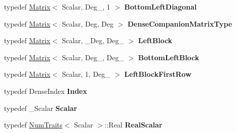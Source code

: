 \begin{DoxyCompactItemize}
typedef \hyperlink{group___core___module_class_eigen_1_1_matrix}{Matrix}$<$ Scalar, Deg\+\_, 1 $>$ {\bfseries Bottom\+Left\+Diagonal}
\item 
\mbox{\label{class_eigen_1_1internal_1_1companion_adcabc9870db81cf1e0db6d645d260c81}} 
typedef \hyperlink{group___core___module_class_eigen_1_1_matrix}{Matrix}$<$ Scalar, Deg, Deg $>$ {\bfseries Dense\+Companion\+Matrix\+Type}
\item 
\mbox{\label{class_eigen_1_1internal_1_1companion_a8a2e8d224bcac4436dd7eb5c04b817d5}} 
typedef \hyperlink{group___core___module_class_eigen_1_1_matrix}{Matrix}$<$ Scalar, \+\_\+\+Deg, Deg\+\_ $>$ {\bfseries Left\+Block}
\item 
\mbox{\label{class_eigen_1_1internal_1_1companion_ae5f271a028b6c68e794ac2f407185672}} 
typedef \hyperlink{group___core___module_class_eigen_1_1_matrix}{Matrix}$<$ Scalar, Deg\+\_, Deg\+\_ $>$ {\bfseries Bottom\+Left\+Block}
\item 
\mbox{\label{class_eigen_1_1internal_1_1companion_afd51b7245870ba33037049bcd2773410}} 
typedef \hyperlink{group___core___module_class_eigen_1_1_matrix}{Matrix}$<$ Scalar, 1, Deg\+\_ $>$ {\bfseries Left\+Block\+First\+Row}
\item 
\mbox{\label{class_eigen_1_1internal_1_1companion_a39a8698e815c86ce2222ac44e5d4bab8}} 
typedef Dense\+Index {\bfseries Index}
\item 
\mbox{\label{class_eigen_1_1internal_1_1companion_a061d1e325a0417ef9cb926133d833e39}} 
typedef \+\_\+\+Scalar {\bfseries Scalar}
\item 
\mbox{\label{class_eigen_1_1internal_1_1companion_a1c462f30c15c1a6233192a2c348139d6}} 
typedef \hyperlink{group___core___module_struct_eigen_1_1_num_traits}{Num\+Traits}$<$ Scalar $>$\+::Real {\bfseries Real\+Scalar}
\item 
\mbox{\label{class_eigen_1_1internal_1_1companion_a69824f07c37938d96dae2e5e4fc97718}} 

\end{DoxyCompactItemize}
